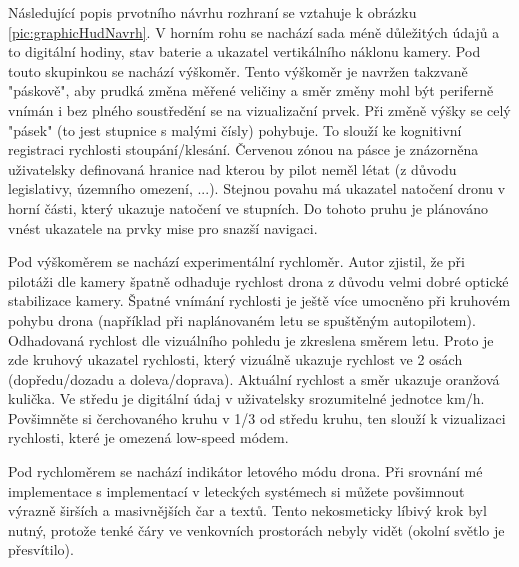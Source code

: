 Následující popis prvotního návrhu rozhraní se vztahuje k obrázku \ref{pic:graphicHudNavrh}. V horním rohu se nachází sada méně důležitých údajů a to digitální hodiny, stav baterie a ukazatel vertikálního náklonu kamery. Pod touto skupinkou se nachází výškoměr. Tento výškoměr je navržen takzvaně "páskově", aby  prudká změna měřené veličiny a směr změny mohl být periferně vnímán i bez plného soustředění se na vizualizační prvek. Při změně výšky se celý "pásek" (to jest stupnice s malými čísly) pohybuje. To slouží ke kognitivní registraci rychlosti stoupání/klesání. Červenou zónou na pásce je znázorněna uživatelsky definovaná hranice nad kterou by pilot neměl létat (z důvodu legislativy, územního omezení, ...). Stejnou povahu má ukazatel natočení dronu v horní části, který ukazuje natočení ve stupních. Do tohoto pruhu je plánováno vnést ukazatele na prvky mise pro snazší navigaci.

Pod výškoměrem se nachází experimentální rychloměr. Autor zjistil, že při pilotáži dle kamery špatně odhaduje rychlost drona z důvodu velmi dobré optické stabilizace kamery. Špatné vnímání rychlosti je ještě více umocněno při kruhovém pohybu drona (například při naplánovaném letu se spuštěným autopilotem). Odhadovaná rychlost dle vizuálního pohledu je zkreslena směrem letu. Proto je zde kruhový ukazatel rychlosti, který vizuálně ukazuje rychlost ve 2 osách (dopředu/dozadu a doleva/doprava). Aktuální rychlost a směr ukazuje oranžová kulička. Ve středu je digitální údaj v uživatelsky srozumitelné jednotce km/h. Povšimněte si čerchovaného kruhu v 1/3 od středu kruhu, ten slouží k vizualizaci rychlosti, které je omezená low-speed módem.

Pod rychloměrem se nachází indikátor letového módu drona. Při srovnání mé implementace s implementací v leteckých systémech si můžete povšimnout výrazně širších a masivnějších čar a textů. Tento nekosmeticky líbivý krok byl nutný, protože tenké čáry ve venkovních prostorách nebyly vidět (okolní světlo je přesvítilo).


